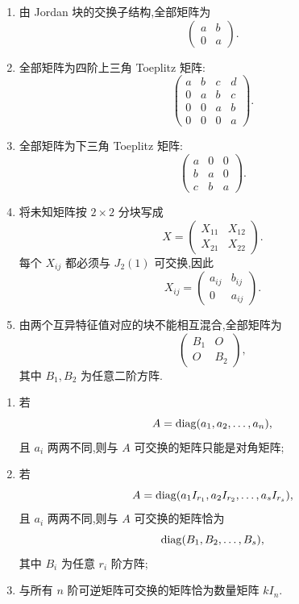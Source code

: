 \begin{solution}
\leavevmode
\begin{enumerate}
  \item 由 Jordan 块的交换子结构,全部矩阵为
  \[
  \boxed{
  \begin{pmatrix}a&b\\0&a\end{pmatrix}
  }.
  \]
  \item 全部矩阵为四阶上三角 Toeplitz 矩阵:
  \[
  \boxed{
  \begin{pmatrix}
a&b&c&d\\
0&a&b&c\\
0&0&a&b\\
0&0&0&a
\end{pmatrix}
  }.
  \]
  \item 全部矩阵为下三角 Toeplitz 矩阵:
  \[
  \boxed{
  \begin{pmatrix}
a&0&0\\
b&a&0\\
c&b&a
\end{pmatrix}
  }.
  \]
  \item 将未知矩阵按 $2\times2$ 分块写成
  \[
  X=\begin{pmatrix}X_{11}&X_{12}\\X_{21}&X_{22}\end{pmatrix}.
  \]
  每个 $X_{ij}$ 都必须与 $J_2(1)$ 可交换,因此
  \[
  \boxed{
  X_{ij}=\begin{pmatrix}a_{ij}&b_{ij}\\0&a_{ij}\end{pmatrix}
  }.
  \]
  \item 由两个互异特征值对应的块不能相互混合,全部矩阵为
  \[
  \boxed{
  \begin{pmatrix}
  B_1&O\\O&B_2
  \end{pmatrix}
  },
  \]
  其中 $B_1,B_2$ 为任意二阶方阵.
\end{enumerate}
\end{solution}

\begin{theorem}[\marktwostar]
\leavevmode
\begin{enumerate}
  \item 若
  \[
  A=\operatorname{diag}(a_1,a_2,\ldots,a_n),
  \]
  且 $a_i$ 两两不同,则与 $A$ 可交换的矩阵只能是对角矩阵;
  \item 若
  \[
  A=\operatorname{diag}(a_1I_{r_1},a_2I_{r_2},\ldots,a_sI_{r_s}),
  \]
  且 $a_i$ 两两不同,则与 $A$ 可交换的矩阵恰为
  \[
  \operatorname{diag}(B_1,B_2,\ldots,B_s),
  \]
  其中 $B_i$ 为任意 $r_i$ 阶方阵;
  \item 与所有 $n$ 阶可逆矩阵可交换的矩阵恰为数量矩阵 $kI_n$.
\end{enumerate}
\end{theorem}

